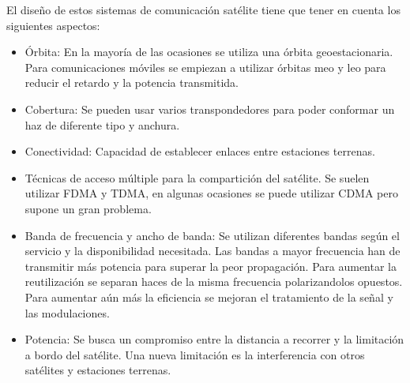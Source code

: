 		El diseño de estos sistemas de comunicación satélite tiene que tener en cuenta los siguientes aspectos:
		\begin{itemize}
			\item Órbita: En la mayoría de las ocasiones se utiliza una órbita geoestacionaria. Para comunicaciones móviles se empiezan a utilizar órbitas meo y leo para reducir el retardo y la potencia transmitida.
			\item Cobertura: Se pueden usar varios transpondedores para poder conformar un haz de diferente tipo y anchura.
			\item Conectividad: Capacidad de establecer enlaces entre estaciones terrenas. 
			\item Técnicas de acceso múltiple para la compartición del satélite. Se suelen utilizar \acrshort{FDMA} y \acrshort{TDMA}, en algunas ocasiones se puede utilizar CDMA pero supone un gran problema.
			\item Banda de frecuencia y ancho de banda: Se utilizan diferentes bandas según el servicio y la disponibilidad necesitada. Las bandas a mayor frecuencia han de transmitir más potencia para superar la peor propagación. Para aumentar la reutilización se separan haces de la misma frecuencia polarizandolos opuestos. Para aumentar aún más la eficiencia se mejoran el tratamiento de la señal y las modulaciones.
			\item Potencia: Se busca un compromiso entre la distancia a recorrer y la limitación a bordo del satélite. Una nueva limitación es la interferencia con otros satélites y estaciones terrenas.
		\end{itemize}
